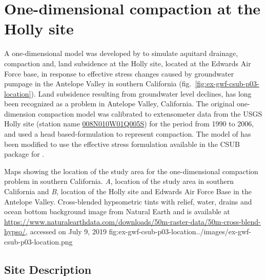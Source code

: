 \section{One-dimensional compaction at the Holly site}

A one-dimensional \mf model was developed by \cite{sneed2008} to simulate aquitard drainage, compaction and, land subsidence at the Holly site, located at the Edwards Air Force base, in response to effective stress changes caused by groundwater pumpage in the Antelope Valley in southern California (fig.~\ref{fig:ex-gwf-csub-p03-location}). Land subsidence resulting from groundwater level declines, has long been recognized as a problem in Antelope Valley, California. The original one-dimension compaction model was calibrated to extensometer data from the USGS Holly site (station name \href{https://waterdata.usgs.gov/ca/nwis/dv/?site_no=344835117531305}{008N010W01Q005S}) for the period from 1990 to 2006, and used a head based-formulation to represent compaction. The model of \cite{sneed2008} has been modified to use the effective stress formulation available in the CSUB package for \mf.

\begin{StandardFigure}{
                                     Maps showing the location of the study area for the one-dimensional 
                                     compaction problem in southern California. \textit{A}, location of the 
                                     study area in southern California and \textit{B}, location of the Holly site and
                                     Edwards Air Force Base in the Antelope Valley. Cross-blended hypsometric 
                                     tints with relief, water, drains and ocean bottom background image from 
                                     Natural Earth and is available at 
                                     \url{https://www.naturalearthdata.com/downloads/50m-raster-data/50m-cross-blend-hypso/}, 
                                     accessed on July 9, 2019 
                                     }{fig:ex-gwf-csub-p03-location}{../images/ex-gwf-csub-p03-location.png}
\end{StandardFigure}                                 

\subsection{Site Description}


